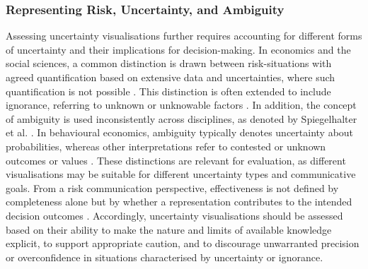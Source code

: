 \documentclass[final,journal,a4paper]{IEEEtran}
\begin{document}
\subsubsection{Representing Risk, Uncertainty, and Ambiguity}
Assessing uncertainty visualisations further requires accounting for different forms of uncertainty and their implications for decision-making. In economics and the social sciences, a common distinction is drawn between risk-situations with agreed quantification based on extensive data and uncertainties, where such quantification is not possible \cite{Spiegelhalter2017}. This distinction is often extended to include ignorance, referring to unknown or unknowable factors \cite{Spiegelhalter2017}. In addition, the concept of ambiguity is used inconsistently across disciplines, as denoted by Spiegelhalter et al. \cite{Spiegelhalter2017}. In behavioural economics, ambiguity typically denotes uncertainty about probabilities, whereas other interpretations refer to contested or unknown outcomes or values \cite{Spiegelhalter2017}. These distinctions are relevant for evaluation, as different visualisations may be suitable for different uncertainty types and communicative goals. From a risk communication perspective, effectiveness is not defined by completeness alone but by whether a representation contributes to the intended decision outcomes \cite{Spiegelhalter2017}. 
\newline
Accordingly, uncertainty visualisations should be assessed based on their ability to make the nature and limits of available knowledge explicit, to support appropriate caution, and to discourage unwarranted precision or overconfidence in situations characterised by uncertainty or ignorance.
\end{document}
